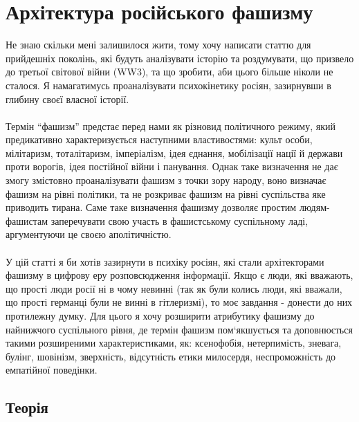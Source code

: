 \section{Архітектура російського фашизму}

Не знаю скільки мені залишилося жити, тому хочу написати статтю для прийдешніх поколінь, які будуть аналізувати історію та роздумувати, що призвело до третьої світової війни (WW3), та що зробити, аби цього більше ніколи не сталося. Я намагатимусь проаналізувати психокінетику росіян, зазирнувши в глибину своєї власної історії.
\\
\\
Термін “фашизм” предстає перед нами як різновид політичного режиму, який предикативно характеризується наступними властивостями: культ особи, мілітаризм, тоталітаризм, імперіалізм, ідея єднання, мобілізації нації й держави проти ворогів, ідея постійної війни і панування. Однак таке визначення не дає змогу змістовно проаналізувати фашизм з точки зору народу, воно визначає фашизм на рівні політики, та не розкриває фашизм на рівні суспільства яке приводить тирана. Саме таке визначення фашизму дозволяє простим людям-фашистам заперечувати свою участь в фашистському суспільному ладі, аргументуючи це своєю аполітичністю.
\\
\\
У цій статті я би хотів зазирнути в психіку росіян, які стали архітекторами фашизму в цифрову еру розповсюдження інформації. Якщо є люди, які вважають, що прості люди росії ні в чому невинні (так як були колись люди, які вважали, що прості германці були не винні в гітлеризмі), то моє завдання - донести до них протилежну думку. Для цього я хочу розширити атрибутику фашизму до найнижчого суспільного рівня, де термін фашизм пом`якшується та доповнюється такими розширеними характеристиками, як: ксенофобія, нетерпимість, зневага, булінг, шовінізм, зверхність, відсутність етики милосердя, неспроможність до емпатійної поведінки.

\subsection{Теорія}

